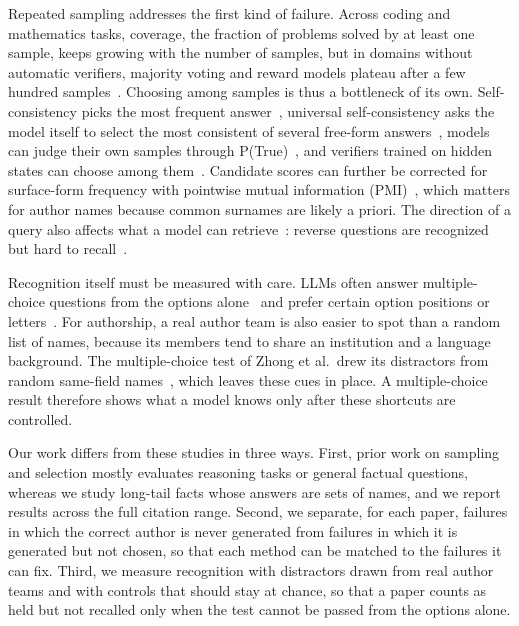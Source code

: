 \documentclass[sigconf,nonacm]{acmart}
\begin{document}
Repeated sampling addresses the first kind of failure. Across coding and mathematics tasks, coverage, the fraction of problems solved by at least one sample, keeps growing with the number of samples, but in domains without automatic verifiers, majority voting and reward models plateau after a few hundred samples~\cite{brown2024monkeys}. Choosing among samples is thus a bottleneck of its own. Self-consistency picks the most frequent answer~\cite{wang2023selfconsistency}, universal self-consistency asks the model itself to select the most consistent of several free-form answers~\cite{chen2023usc}, models can judge their own samples through P(True)~\cite{kadavath2022know}, and verifiers trained on hidden states can choose among them~\cite{orgad2025knowmore}. Candidate scores can further be corrected for surface-form frequency with pointwise mutual information (PMI)~\cite{holtzman2021surface}, which matters for author names because common surnames are likely a priori. The direction of a query also affects what a model can retrieve~\cite{berglund2024reversal}: reverse questions are recognized but hard to recall~\cite{calderon2026emptyshelves}.
 
Recognition itself must be measured with care. LLMs often answer multiple-choice questions from the options alone~\cite{balepur2024artifacts} and prefer certain option positions or letters~\cite{zheng2024mcq}. For authorship, a real author team is also easier to spot than a random list of names, because its members tend to share an institution and a language background. The multiple-choice test of Zhong et al.\ drew its distractors from random same-field names~\cite{zhong2026dreaming}, which leaves these cues in place. A multiple-choice result therefore shows what a model knows only after these shortcuts are controlled.

Our work differs from these studies in three ways. First, prior work on sampling and selection mostly evaluates reasoning tasks or general factual questions, whereas we study long-tail facts whose answers are sets of names, and we report results across the full citation range. Second, we separate, for each paper, failures in which the correct author is never generated from failures in which it is generated but not chosen, so that each method can be matched to the failures it can fix. Third, we measure recognition with distractors drawn from real author teams and with controls that should stay at chance, so that a paper counts as held but not recalled only when the test cannot be passed from the options alone.
 


\end{document}
